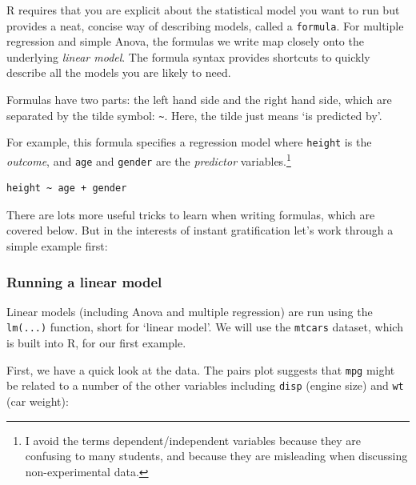 \documentclass[]{article}
\newenvironment{Shaded}{\begin{snugshade}}{\end{snugshade}}
\newcommand{\KeywordTok}[1]{\textcolor[rgb]{0.13,0.29,0.53}{\textbf{#1}}}
\newcommand{\NormalTok}[1]{#1}
\newcommand{\OperatorTok}[1]{\textcolor[rgb]{0.81,0.36,0.00}{\textbf{#1}}}
\newcommand{\StringTok}[1]{\textcolor[rgb]{0.31,0.60,0.02}{#1}}
\let\rmarkdownfootnote\footnote%
\def\footnote{\protect\rmarkdownfootnote}
\begin{document}
R requires that you are explicit about the statistical model you want to run but
provides a neat, concise way of describing models, called a \texttt{formula}. For
multiple regression and simple Anova, the formulas we write map closely onto the
underlying \emph{linear model}. The formula syntax provides shortcuts to quickly
describe all the models you are likely to need.

Formulas have two parts: the left hand side and the right hand side, which are
separated by the tilde symbol: \texttt{\textasciitilde{}}. Here, the tilde just means `is predicted
by'.

For example, this formula specifies a regression model where \texttt{height} is the
\emph{outcome}, and \texttt{age} and \texttt{gender} are the \emph{predictor} variables.\footnote{I avoid the
  terms dependent/independent variables because they are confusing to many
  students, and because they are misleading when discussing non-experimental
  data.}

\begin{verbatim}
height ~ age + gender
\end{verbatim}

There are lots more useful tricks to learn when writing formulas, which are
covered below. But in the interests of instant gratification let's work through
a simple example first:

\hypertarget{running-a-linear-model}{%
\subsubsection*{Running a linear model}\label{running-a-linear-model}}

Linear models (including Anova and multiple regression) are run using the
\texttt{lm(...)} function, short for `linear model'. We will use the \texttt{mtcars} dataset,
which is built into R, for our first example.

First, we have a quick look at the data. The pairs plot suggests that \texttt{mpg}
might be related to a number of the other variables including \texttt{disp} (engine
size) and \texttt{wt} (car weight):

\begin{Shaded}
\end{Shaded}
\end{document}
